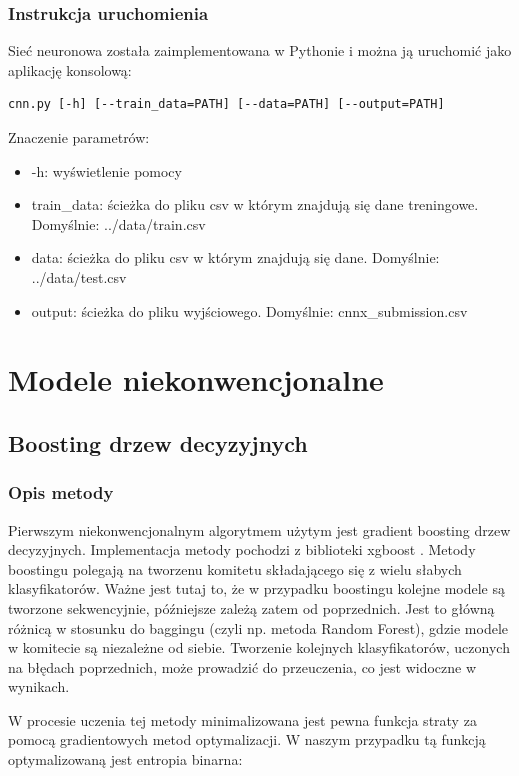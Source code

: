 \documentclass[12pt]{article}
\begin{document}
\subsubsection{Instrukcja uruchomienia}
Sieć neuronowa została zaimplementowana w Pythonie i można ją uruchomić jako aplikację konsolową:
\begin{lstlisting}
cnn.py [-h] [--train_data=PATH] [--data=PATH] [--output=PATH]
\end{lstlisting}
Znaczenie parametrów:

\begin{itemize}
    \item -h: wyświetlenie pomocy
    \item train{\_}data: ścieżka do pliku csv w którym znajdują się dane treningowe. Domyślnie: ../data/train.csv
    \item data: ścieżka do pliku csv w którym znajdują się dane. Domyślnie: ../data/test.csv
    \item output: ścieżka do pliku wyjściowego. Domyślnie: cnnx{\_}submission.csv
\end{itemize}

\section{Modele niekonwencjonalne}

\subsection{Boosting drzew decyzyjnych}

\subsubsection{Opis metody}

Pierwszym niekonwencjonalnym algorytmem użytym jest gradient boosting drzew decyzyjnych. Implementacja metody pochodzi z biblioteki xgboost \cite{xgboost}. Metody boostingu polegają na tworzenu komitetu składającego się z wielu słabych klasyfikatorów. Ważne jest tutaj to, że w przypadku boostingu kolejne modele są tworzone sekwencyjnie, późniejsze zależą zatem od poprzednich. Jest to główną różnicą w stosunku do baggingu (czyli np. metoda Random Forest), gdzie modele w komitecie są niezależne od siebie. Tworzenie kolejnych klasyfikatorów, uczonych na błędach poprzednich, może prowadzić do przeuczenia, co jest widoczne w wynikach.

W procesie uczenia tej metody minimalizowana jest pewna funkcja straty za pomocą gradientowych metod optymalizacji. W naszym przypadku tą funkcją optymalizowaną jest entropia binarna:
\end{document}
